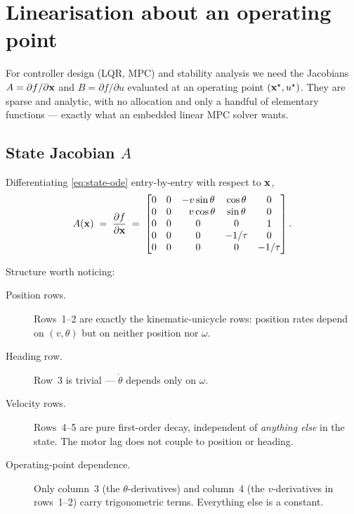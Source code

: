 \section{Linearisation about an operating point}
\label{sec:linearization}

For controller design (LQR, MPC) and stability analysis we need the Jacobians $A = \partial f / \partial \mathbf{x}$ and $B = \partial f / \partial u$ evaluated at an operating point $(\mathbf{x}^{\star}, u^{\star})$. They are sparse and analytic, with no allocation and only a handful of elementary functions --- exactly what an embedded linear MPC solver wants.

\subsection{State Jacobian \texorpdfstring{$A$}{A}}

Differentiating \eqref{eq:state-ode} entry-by-entry with respect to $\mathbf{x}$,
\begin{equation}
    A(\mathbf{x}) \;=\; \frac{\partial f}{\partial \mathbf{x}} \;=\;
    \begin{bmatrix}
        0 & 0 & -v\sin\theta & \cos\theta & 0 \\
        0 & 0 & \phantom{-}v\cos\theta & \sin\theta & 0 \\
        0 & 0 & 0 & 0 & 1 \\
        0 & 0 & 0 & -1/\tau & 0 \\
        0 & 0 & 0 & 0 & -1/\tau
    \end{bmatrix}.
    \label{eq:Amat}
\end{equation}

Structure worth noticing:
\begin{description}
    \item[Position rows.] Rows~1--2 are exactly the kinematic-unicycle rows: position rates depend on $(v, \theta)$ but on neither position nor $\omega$.
    \item[Heading row.] Row~3 is trivial --- $\dot\theta$ depends only on $\omega$.
    \item[Velocity rows.] Rows~4--5 are pure first-order decay, independent of \emph{anything else} in the state. The motor lag does not couple to position or heading.
    \item[Operating-point dependence.] Only column~3 (the $\theta$-derivatives) and column~4 (the $v$-derivatives in rows~1--2) carry trigonometric terms. Everything else is a constant.
\end{description}

